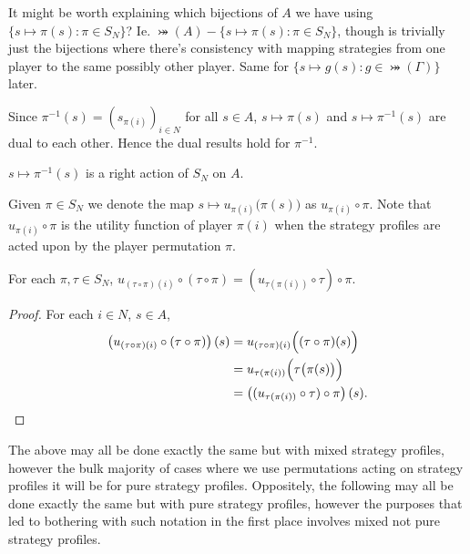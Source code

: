 It might be worth explaining which bijections of $A$ we have using $\{s\mapsto\pi(s): \pi \in S_N\}$? Ie. $\bij(A)-\{s\mapsto\pi(s): \pi \in S_N\}$, though is trivially just the bijections where there's consistency with mapping strategies from one player to the same possibly other player. Same for $\{s\mapsto g(s): g \in \bij(\Gamma)\}$ later. 

Since $\pi^{-1}(s) = (s_{\pi(i)})_{i \in N}$ for all $s \in A$, $s \mapsto \pi(s)$ and $s \mapsto \pi^{-1}(s)$ are dual to each other. Hence the dual results hold for $\pi^{-1}$.

\begin{lemma} 
	$s \mapsto \pi^{-1}(s)$ is a right action of $S_N$ on $A$.
\end{lemma}

Given $\pi \in S_N$ we denote the map $s \mapsto u_{\pi(i)}\bigl(\pi(s)\bigr)$ as $u_{\pi(i)} \circ \pi$. Note that $u_{\pi(i)} \circ \pi$ is the utility function of player $\pi(i)$ when the strategy profiles are acted upon by the player permutation $\pi$.

\begin{corollary} \label{utilityactionprop}
	For each $\pi, \tau \in S_N$, $u_{(\tau \circ \pi)(i)} \circ (\tau \circ \pi) = (u_{\tau(\pi(i))} \circ \tau) \circ \pi$.
	\begin{proof}
		For each $i \in N$, $s \in A$, 
		\begin{align*}
			\left(u_{(\tau \circ \pi)(i)} \circ (\tau \circ \pi)\right)(s) &= u_{(\tau \circ \pi)(i)}\Bigl((\tau \circ \pi)(s)\Bigr) \\
			&= u_{\tau(\pi(i))}\Bigl(\tau\bigl(\pi(s)\bigr)\Bigr) \\
			&= \left((u_{\tau(\pi(i))} \circ \tau) \circ \pi\right)(s).
		\end{align*}
	\end{proof}
\end{corollary}

The above may all be done exactly the same but with mixed strategy profiles, however the bulk majority of cases where we use permutations acting on strategy profiles it will be for pure strategy profiles. Oppositely, the following may all be done exactly the same but with pure strategy profiles, however the purposes that led to bothering with such notation in the first place involves mixed not pure strategy profiles. 

